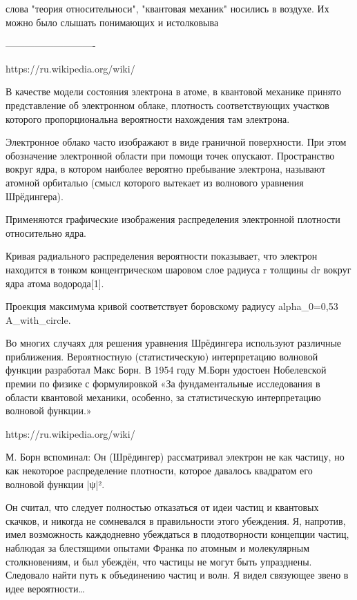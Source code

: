  
слова "теория относительноси", "квантовая механик" носились в воздухе. Их можно было слышать  понимающих и истолковыва

----------------------------



https://ru.wikipedia.org/wiki/%
{
В качестве модели состояния электрона в атоме, в квантовой механике принято представление об электронном облаке, плотность соответствующих участков которого пропорциональна вероятности нахождения там электрона.

Электронное облако часто изображают в виде граничной поверхности. При этом обозначение электронной области при помощи точек опускают. Пространство вокруг ядра, в котором наиболее вероятно пребывание электрона, называют атомной орбиталью (смысл которого вытекает из волнового уравнения Шрёдингера).

Применяются графические изображения распределения электронной плотности относительно ядра.

Кривая радиального распределения вероятности показывает, что электрон находится в тонком концентрическом шаровом слое радиуса r толщины dr вокруг ядра атома водорода[1].

Проекция максимума кривой соответствует боровскому радиусу alpha_0=0,53 A_with_circle.

Во многих случаях для решения уравнения Шрёдингера используют различные приближения. Вероятностную (статистическую) интерпретацию волновой функции разработал Макс Борн. В 1954 году М.Борн удостоен Нобелевской премии по физике с формулировкой «За фундаментальные исследования в области квантовой механики, особенно, за статистическую интерпретацию волновой функции.»
}

https://ru.wikipedia.org/wiki/%
{
М. Борн вспоминал:
Он (Шрёдингер) рассматривал электрон не как частицу, но как некоторое распределение плотности, которое давалось квадратом его волновой функции |ψ|².

Он считал, что следует полностью отказаться от идеи частиц и квантовых скачков, и никогда не сомневался в правильности этого убеждения. Я, напротив, имел возможность каждодневно убеждаться в плодотворности концепции частиц, наблюдая за блестящими опытами Франка по атомным и молекулярным столкновениям, и был убеждён, что частицы не могут быть упразднены. Следовало найти путь к объединению частиц и волн. Я видел связующее звено в идее вероятности…
}




